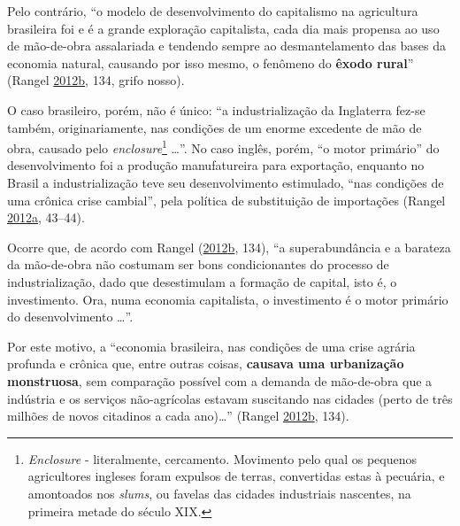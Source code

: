 \documentclass[
	12pt,				%
	oneside,			%
	a4paper,			%
	chapter=TITLE,		%
	section=TITLE,		%
	english,			%
	brazil				%
	]{abntex2}
\begin{document}
Pelo contrário, ``o modelo de desenvolvimento do capitalismo na agricultura
brasileira foi e é a grande exploração capitalista, cada dia mais propensa ao
uso de mão-de-obra assalariada e tendendo sempre ao desmantelamento das bases da
economia natural, causando por isso mesmo, o fenômeno do \textbf{êxodo rural}''
(Rangel \protect\hyperlink{ref-rangel1986b}{2012}\protect\hyperlink{ref-rangel1986b}{b}, 134, grifo nosso).

O caso brasileiro, porém, não é único: ``a industrialização da Inglaterra fez-se
também, originariamente, nas condições de um enorme excedente de mão de obra,
causado pelo \emph{enclosure}\footnote{\emph{Enclosure} - literalmente, cercamento. Movimento pelo qual os pequenos
  agricultores ingleses foram expulsos de terras, convertidas estas à pecuária, e
  amontoados nos \emph{slums}, ou favelas das cidades industriais nascentes, na
  primeira metade do século XIX.} \ldots{}''. No caso inglês, porém, ``o motor primário'' do
desenvolvimento foi a produção manufatureira para exportação, enquanto no Brasil
a industrialização teve seu desenvolvimento estimulado, ``nas condições de uma
crônica crise cambial'', pela política de substituição de importações
(Rangel \protect\hyperlink{ref-rangel1962}{2012}\protect\hyperlink{ref-rangel1962}{a}, 43--44).

Ocorre que, de acordo com Rangel (\protect\hyperlink{ref-rangel1986b}{2012}\protect\hyperlink{ref-rangel1986b}{b}, 134), ``a superabundância e a
barateza da mão-de-obra não costumam ser bons condicionantes do processo de
industrialização, dado que desestimulam a formação de capital, isto é, o
investimento. Ora, numa economia capitalista, o investimento é o motor primário
do desenvolvimento \ldots{}''.

Por este motivo, a ``economia brasileira, nas condições de uma crise agrária
profunda e crônica que, entre outras coisas, \textbf{causava uma urbanização
monstruosa}, sem comparação possível com a demanda de mão-de-obra que a
indústria e os serviços não-agrícolas estavam suscitando nas cidades (perto de
três milhões de novos citadinos a cada ano)\ldots{}'' (Rangel \protect\hyperlink{ref-rangel1986b}{2012}\protect\hyperlink{ref-rangel1986b}{b}, 134).
\end{document}
